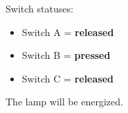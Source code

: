 
Switch statuses:

\begin{itemize}
\item{} Switch A = {\bf released}
\item{} Switch B = {\bf pressed}
\item{} Switch C = {\bf released}
\end{itemize}

The lamp will be energized.











